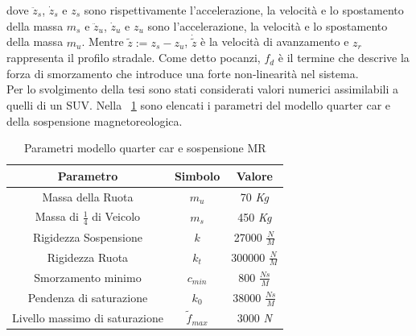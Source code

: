 dove $\ddot{z}_s$, $\dot{z}_s$ e $z_s$ sono rispettivamente l'accelerazione, la velocità e lo spostamento della massa $m_s$ e $\ddot{z}_u$, $\dot{z}_u$ e $z_u$ sono l'accelerazione, la velocità e lo spostamento della massa $m_u$. Mentre $\tilde{z} := z_s - z_u$, $\dot{\tilde{z}}$ è la velocità di avanzamento e $z_r$ rappresenta il profilo stradale. Come detto pocanzi, \textit{$f_d$} è il termine che descrive la forza di smorzamento che introduce una forte non-linearità nel sistema.\\

Per lo svolgimento della tesi sono stati considerati valori numerici assimilabili a quelli di un SUV. Nella \tablename \ \ref{parametri} sono elencati i parametri del modello quarter car e della sospensione magnetoreologica.

\renewcommand\arraystretch{1.4} 
\begin{table}[hbt]
	\centering
	\begin{tabular}{|c||c|c|}
		\hline
		\textbf{Parametro} & \textbf{Simbolo} & \textbf{Valore} \\
		\hline	Massa della Ruota & \textit{$m_u$} & 70 \textit{Kg}\\
		\hline	Massa di $\frac{1}{4}$ di Veicolo & \textit{$m_s$} & 450 \textit{Kg}\\
		\hline	Rigidezza Sospensione & \textit{$k$} & 27000 \textit{$\frac{N}{M}$}\\
		\hline	Rigidezza Ruota & \textit{$k_t$} & 300000 \textit{$\frac{N}{M}$}\\
		\hline	Smorzamento minimo & \textit{$c_{min}$} & 800 \textit{$\frac{N s}{M}$}\\
		\hline	Pendenza di saturazione & \textit{$k_0$} & 38000 \textit{$\frac{N s}{M}$}\\
		\hline	Livello massimo di saturazione & \textit{$\tilde{f}_{max}$} & 3000 \textit{N}\\		
		\hline
	\end{tabular}
	\caption{Parametri modello quarter car e sospensione MR}
	\label{parametri}
\end{table}


